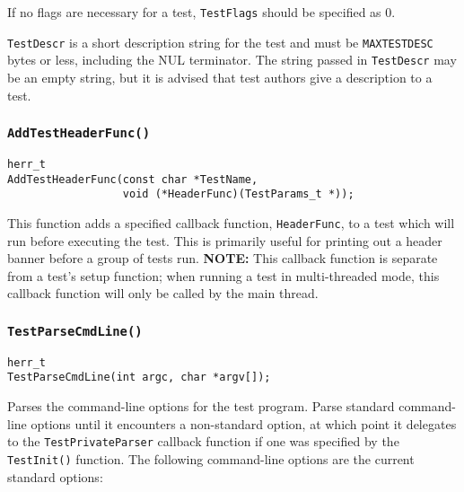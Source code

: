 \documentclass[../HDF5_RFC.tex]{subfiles}
\begin{document}
If no flags are necessary for a test, \texttt{TestFlags} should be specified as 0.

\texttt{TestDescr} is a short description string for the test and must be \texttt{MAXTESTDESC} bytes
or less, including the NUL terminator. The string passed in \texttt{TestDescr} may be an empty string,
but it is advised that test authors give a description to a test.

\subsubsection{\texttt{AddTestHeaderFunc()}}
\label{apdx:testframe_addtestheaderfunc}

\begin{verbatim}
herr_t
AddTestHeaderFunc(const char *TestName,
                  void (*HeaderFunc)(TestParams_t *));
\end{verbatim}

This function adds a specified callback function, \texttt{HeaderFunc}, to a test which will run
before executing the test. This is primarily useful for printing out a header banner before
a group of tests run. \textbf{NOTE:} This callback function is separate from a test's setup function;
when running a test in multi-threaded mode, this callback function will only be called by the main
thread.

\subsubsection{\texttt{TestParseCmdLine()}}

\begin{verbatim}
herr_t
TestParseCmdLine(int argc, char *argv[]);
\end{verbatim}

Parses the command-line options for the test program. Parse standard command-line options until it
encounters a non-standard option, at which point it delegates to the \texttt{TestPrivateParser} callback
function if one was specified by the \texttt{TestInit()} function. The following command-line options
are the current standard options:
\end{document}
